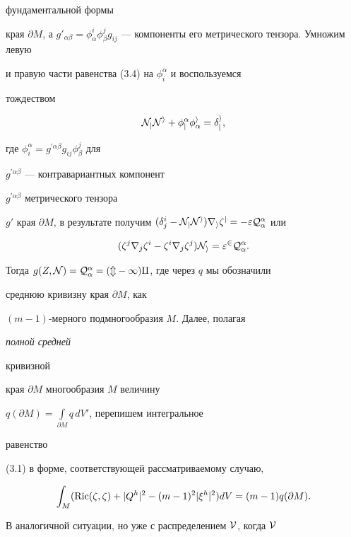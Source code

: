 фундаментальной формы 


края $\partial M$, а $g'_{\alpha\beta}=\phi^i_\alpha\phi^j_\beta 


g_{ij}$ --- компоненты его метрического тензора. Умножим левую 


и правую части равенства (3.4) на $\phi^\alpha_i$ и воспользуемся 


тождеством 


$$ 


\cal N_j\cal N^i+\phi^\alpha_j\phi^i_\alpha=\delta^i_j, 


$$ 


где $\phi^\alpha_i=g^{\prime\alpha\beta}g_{ij}\phi^j_\beta$ для 


$g^{\prime\alpha\beta}$ --- контравариантных компонент 


$g^{\prime\alpha\beta}$ метрического тензора 


$g'$ края $\partial M$, в результате получим $(\delta^i_j-\cal N_j\cal 


N^i)\nabla_i\zeta^j=-\varepsilon Q^\alpha_\alpha$ или 


$$ 


(\zeta^j\nabla_j\zeta^i-\zeta^i\nabla_j\zeta^j)\cal N_i= 


\varepsilon^2Q^\alpha_\alpha. 


$$ 


Тогда $g(Z,\cal N)=Q^\alpha_\alpha=(m-1)q$, где через $q$ мы обозначили 


среднюю кривизну края $\partial M$, как 


$(m-1)$-мерного подмногообразия $M$. Далее, полагая {\it полной средней 


кривизной} 


края $\partial M$ многообразия $M$ величину 


$q(\partial M)=\int\limits_{\partial M}q\,dV'$, перепишем интегральное 


равенство 


(3.1) в форме, соответствующей рассматриваемому случаю, 


\begin{equation} 


\int_M(\Ric(\zeta,\zeta)+|Q^h|^2-(m-1)^2|\xi^h|^2)dV= 


(m-1)q(\partial M). 


\end{equation} 


 


В аналогичной ситуации, но уже с распределением $\cal V$, когда $\cal V$ 



